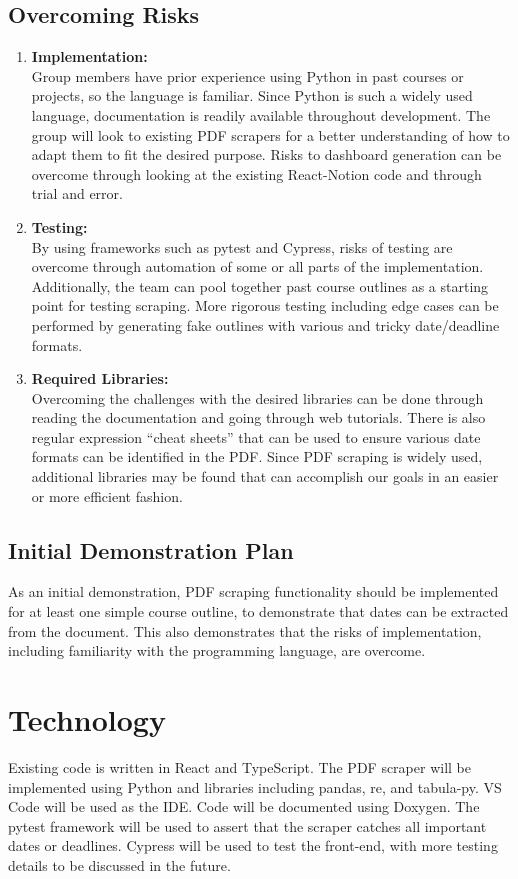 \documentclass[12pt, titlepage]{article}
\begin{document}
\newpage
\subsection{Overcoming Risks}
\begin{enumerate}
  \item \textbf{Implementation:}\\
Group members have prior experience using Python in past courses or projects, so the language is familiar. Since Python is such a widely used language, documentation is readily available throughout development. The group will look to existing PDF scrapers for a better understanding of how to adapt them to fit the desired purpose. Risks to dashboard generation can be overcome through looking at the existing React-Notion code and through trial and error. 
  \item \textbf{Testing:}\\
By using frameworks such as pytest and Cypress, risks of testing are overcome through automation of some or all parts of the implementation. Additionally, the team can pool together past course outlines as a starting point for testing scraping. More rigorous testing including edge cases can be performed by generating fake outlines with various and tricky date/deadline formats.  
  \item \textbf{Required Libraries:}\\
Overcoming the challenges with the desired libraries can be done through reading the documentation and going through web tutorials. There is also regular expression “cheat sheets” that can be used to ensure various date formats can be identified in the PDF. Since PDF scraping is widely used, additional libraries may be found that can accomplish our goals in an easier or more efficient fashion. 
\end{enumerate}

\subsection{Initial Demonstration Plan}
As an initial demonstration, PDF scraping functionality should be implemented for at least one simple course outline, to demonstrate that dates can be extracted from the document. This also demonstrates that the risks of implementation, including familiarity with the programming language, are overcome. 

\section{Technology}
Existing code is written in React and TypeScript. The PDF scraper will be implemented using Python and libraries including pandas, re, and tabula-py. VS Code will be used as the IDE. Code will be documented using Doxygen. The pytest framework will be used to assert that the scraper catches all important dates or deadlines. Cypress will be used to test the front-end, with more testing details to be discussed in the future. 
\end{document}
